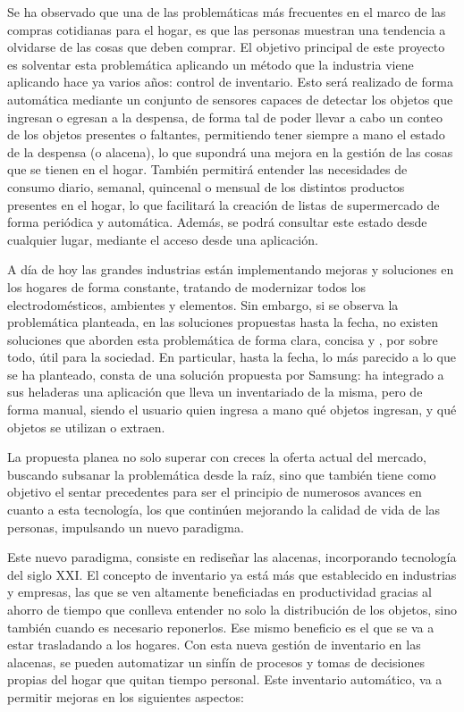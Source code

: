 \documentclass[
11pt, %
codirector, %
]{charter}
\begin{document}
Se ha observado que  una de las problemáticas más frecuentes en el marco de las compras cotidianas para el hogar, es que las personas muestran una tendencia a olvidarse de las cosas que deben comprar. El objetivo principal de este proyecto es solventar esta problemática aplicando un método que la industria viene aplicando hace ya varios años: control de inventario. Esto será realizado de forma automática mediante un conjunto de sensores capaces de detectar los objetos que ingresan o egresan a la despensa, de forma tal de poder llevar a cabo un conteo de los objetos presentes o faltantes, permitiendo tener siempre a mano el estado de la despensa (o alacena), lo que supondrá una mejora en la gestión de las cosas que se tienen en el hogar. También permitirá entender las necesidades de consumo diario, semanal, quincenal o mensual de los distintos productos presentes en el hogar, lo que facilitará la creación de listas de supermercado de forma periódica y automática. Además, se podrá consultar este estado desde cualquier lugar, mediante el acceso desde una aplicación. 

A día de hoy las grandes industrias están implementando mejoras y soluciones en los hogares de forma constante, tratando de modernizar todos los electrodomésticos, ambientes y elementos. Sin embargo, si se observa la problemática planteada, en las soluciones propuestas hasta la fecha, no existen soluciones que aborden esta problemática de forma clara, concisa y , por sobre todo, útil para la sociedad. En particular, hasta la fecha, lo más parecido a lo que se ha planteado, consta de una solución propuesta por Samsung: ha integrado a sus heladeras una aplicación que lleva un inventariado de la misma, pero de forma manual, siendo el usuario quien ingresa a mano qué objetos ingresan, y qué objetos se utilizan o extraen.

La propuesta planea no solo superar con creces la oferta actual del mercado, buscando subsanar la problemática desde la raíz, sino que también tiene como objetivo el sentar precedentes para ser el principio de numerosos avances en cuanto a esta tecnología, los que continúen mejorando la calidad de vida de las personas, impulsando un nuevo paradigma. 

Este nuevo paradigma, consiste en rediseñar las alacenas, incorporando tecnología del siglo XXI. El concepto de inventario ya está más que establecido en  industrias y empresas, las que se ven altamente beneficiadas en productividad gracias al ahorro de tiempo que  conlleva entender no solo la distribución de los objetos, sino también cuando es necesario reponerlos. Ese mismo beneficio es el que se va a estar trasladando a los hogares. Con esta nueva gestión de inventario en las alacenas, se pueden automatizar un sinfín de procesos y tomas de decisiones propias del hogar que quitan tiempo personal. Este inventario automático, va a permitir mejoras en los siguientes aspectos:
\end{document}
